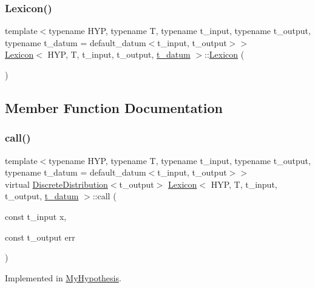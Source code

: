 \subsubsection{\texorpdfstring{Lexicon()}{Lexicon()}\hspace{0.1cm}{\footnotesize\ttfamily [2/2]}}
{\footnotesize\ttfamily template$<$typename H\+YP, typename T, typename t\+\_\+input, typename t\+\_\+output, typename t\+\_\+datum = default\+\_\+datum$<$t\+\_\+input, t\+\_\+output$>$$>$ \\
\hyperlink{class_lexicon}{Lexicon}$<$ H\+YP, T, t\+\_\+input, t\+\_\+output, \hyperlink{class_bayesable_a7c93a2eeab708378eb321745908718d4}{t\+\_\+datum} $>$\+::\hyperlink{class_lexicon}{Lexicon} (\begin{DoxyParamCaption}{ }\end{DoxyParamCaption})\hspace{0.3cm}{\ttfamily [inline]}}



\subsection{Member Function Documentation}
\mbox{\label{class_lexicon_aaaff682145f9cb15f7252420fe76f111}} 
\subsubsection{\texorpdfstring{call()}{call()}}
{\footnotesize\ttfamily template$<$typename H\+YP, typename T, typename t\+\_\+input, typename t\+\_\+output, typename t\+\_\+datum = default\+\_\+datum$<$t\+\_\+input, t\+\_\+output$>$$>$ \\
virtual \hyperlink{class_discrete_distribution}{Discrete\+Distribution}$<$t\+\_\+output$>$ \hyperlink{class_lexicon}{Lexicon}$<$ H\+YP, T, t\+\_\+input, t\+\_\+output, \hyperlink{class_bayesable_a7c93a2eeab708378eb321745908718d4}{t\+\_\+datum} $>$\+::call (\begin{DoxyParamCaption}\item[{const t\+\_\+input}]{x,  }\item[{const t\+\_\+output}]{err }\end{DoxyParamCaption})\hspace{0.3cm}{\ttfamily [pure virtual]}}



Implemented in \hyperlink{class_my_hypothesis_a61391d3f1f6fbbe37663b22e2068ac90}{My\+Hypothesis}.

